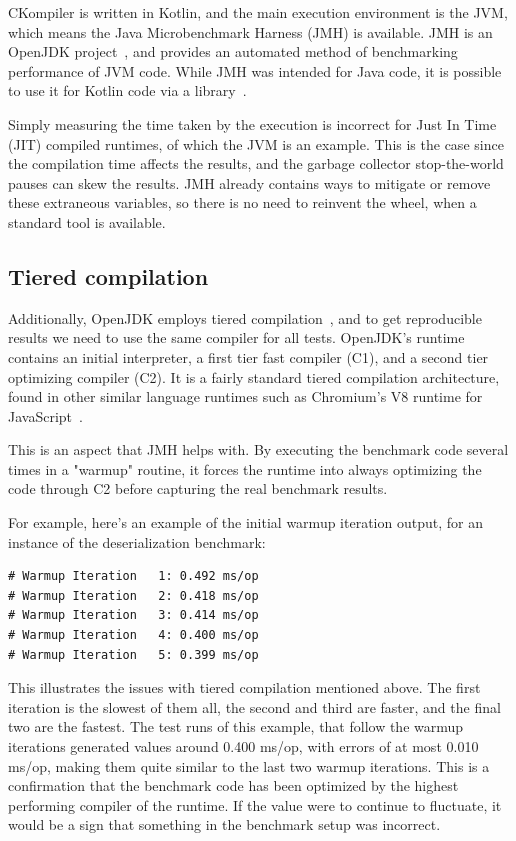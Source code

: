 \documentclass[lettersize,journal]{IEEEtran}
\begin{document}
    CKompiler is written in Kotlin, and the main execution environment is the JVM, which means the Java Microbenchmark
    Harness (JMH) is available.
    JMH is an OpenJDK project~\cite{jmh-github}, and provides an automated method of benchmarking performance of JVM
    code.
    While JMH was intended for Java code, it is possible to use it for Kotlin code via a
    library~\cite{kotlinx-benchmark}.

    Simply measuring the time taken by the execution is incorrect for Just In Time (JIT) compiled runtimes, of which the
    JVM is an example.
    This is the case since the compilation time affects the results, and the garbage collector stop-the-world pauses can
    skew the results.
    JMH already contains ways to mitigate or remove these extraneous variables, so there is no need to reinvent the
    wheel, when a standard tool is available.

    \subsection{Tiered compilation}\label{subsec:tiered-compilation}

    Additionally, OpenJDK employs tiered compilation~\cite{tiered-compilation}, and to get reproducible results we need
    to use the same compiler for all tests.
    OpenJDK's runtime contains an initial interpreter, a first tier fast compiler (C1), and a second tier optimizing
    compiler (C2).
    It is a fairly standard tiered compilation architecture, found in other similar language runtimes such as
    Chromium's V8 runtime for JavaScript~\cite{v8-tiered}.

    This is an aspect that JMH helps with.
    By executing the benchmark code several times in a "warmup" routine, it forces the runtime into always optimizing
    the code through C2 before capturing the real benchmark results.

    For example, here's an example of the initial warmup iteration output, for an instance of the deserialization
    benchmark:
    \begin{verbatim}
# Warmup Iteration   1: 0.492 ms/op
# Warmup Iteration   2: 0.418 ms/op
# Warmup Iteration   3: 0.414 ms/op
# Warmup Iteration   4: 0.400 ms/op
# Warmup Iteration   5: 0.399 ms/op
    \end{verbatim}

    This illustrates the issues with tiered compilation mentioned above.
    The first iteration is the slowest of them all, the second and third are faster, and the final two are the fastest.
    The test runs of this example, that follow the warmup iterations generated values around 0.400 ms/op, with errors of
    at most 0.010 ms/op, making them quite similar to the last two warmup iterations.
    This is a confirmation that the benchmark code has been optimized by the highest performing compiler of the runtime.
    If the value were to continue to fluctuate, it would be a sign that something in the benchmark setup was incorrect.
\end{document}
